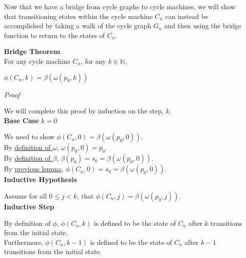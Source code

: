 \documentclass[a4paper,12pt]{article}
\begin{document}
\noindent Now that we have a bridge from cycle graphs to cycle machines, we will show that transitioning states within the cycle machine $C_n$ can instead be accomplished by taking a walk of the cycle graph $G_n$ and then using the bridge function to return to the states of $C_n$.\\






\label{theorem:bridge_theorem}
\hypertarget{theorem:bridge_theorem}{}
\begin{tcolorbox}
\textbf{Bridge Theorem}\\
For any cycle machine $C_n$, for any $k \in \mathbb{N}$,

\begin{center}
$\phi(C_n, k) = \beta(\omega(p_0, k))$
\end{center}

\end{tcolorbox}

\noindent
\textit{Proof}

\noindent We will complete this proof by induction on the step, $k$.\\


\noindent
\textbf{Base Case} $k = 0$

\noindent We need to show $\phi(C_n, 0) = \beta(\omega(p_0, 0))$.\\

\noindent By \hyperlink{definition:walk_functions}{definition of $\omega$}, $\omega(p_0, 0) = p_0$.\\

\noindent By \hyperlink{definition:bridge_function}{definition of $\beta$}, $\beta(p_0) = s_0 = \beta(\omega(p_0, 0))$.\\

\noindent By \hyperlink{lemma:phi_of_0}{previous lemma}, $\phi(C_n, 0) = s_0 = \beta(\omega(p_0, 0))$.\\


\noindent
\textbf{Inductive Hypothesis}

\noindent Assume for all $0 \leq j < k$, that $\phi(C_n, j) = \beta(\omega(p_0, j))$.\\


\noindent
\textbf{Inductive Step}

\noindent By definition of $\phi$, $\phi(C_n, k)$ is defined to be the state of $C_n$ after $k$ transitions from the initial state.\\

\noindent Furthermore, $\phi(C_n, k - 1)$ is defined to be the state of $C_n$ after $k - 1$ transitions from the initial state.\\
\end{document}
